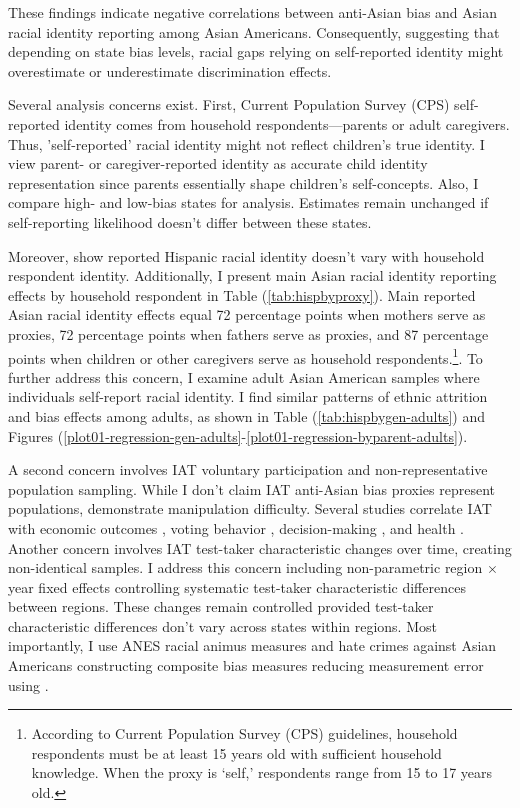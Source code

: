 These findings indicate negative correlations between anti-Asian bias and Asian racial identity reporting among Asian Americans. Consequently, suggesting that depending on state bias levels, racial gaps relying on self-reported identity might overestimate or underestimate discrimination effects.

Several analysis concerns exist. First, Current Population Survey (CPS) self-reported identity comes from household respondents—parents or adult caregivers. Thus, 'self-reported' racial identity might not reflect children's true identity. I view parent- or caregiver-reported identity as accurate child identity representation since parents essentially shape children's self-concepts. Also, I compare high- and low-bias states for analysis. Estimates remain unchanged if self-reporting likelihood doesn't differ between these states.

Moreover, \textcite{duncanIntermarriageIntergenerationalTransmission2011} show reported Hispanic racial identity doesn't vary with household respondent identity. Additionally, I present main Asian racial identity reporting effects by household respondent in Table (\ref{tab:hispbyproxy}). Main reported Asian racial identity effects equal 72 percentage points when mothers serve as proxies, 72 percentage points when fathers serve as proxies, and 87 percentage points when children or other caregivers serve as household respondents.\footnote{According to Current Population Survey (CPS) guidelines, household respondents must be at least 15 years old with sufficient household knowledge. When the proxy is `self,' respondents range from 15 to 17 years old.}. To further address this concern, I examine adult Asian American samples where individuals self-report racial identity. I find similar patterns of ethnic attrition and bias effects among adults, as shown in Table (\ref{tab:hispbygen-adults}) and Figures (\ref{plot01-regression-gen-adults}-\ref{plot01-regression-byparent-adults}).

A second concern involves IAT voluntary participation and non-representative population sampling. While I don't claim IAT anti-Asian bias proxies represent populations, \textcite{egloffPredictiveValidityImplicit2002} demonstrate manipulation difficulty. Several studies correlate IAT with economic outcomes \autocite{chettyRaceEconomicOpportunity2020,gloverDiscriminationSelfFulfillingProphecy2017}, voting behavior \autocite{friesePredictingVotingBehavior2007}, decision-making \autocite{bertrandImplicitDiscrimination2005,carlanaImplicitStereotypesEvidence2019}, and health \autocite{leitnerRacialBiasAssociated2016}. Another concern involves IAT test-taker characteristic changes over time, creating non-identical samples. I address this concern including non-parametric region $\times$ year fixed effects controlling systematic test-taker characteristic differences between regions. These changes remain controlled provided test-taker characteristic differences don't vary across states within regions. Most importantly, I use ANES racial animus measures and hate crimes against Asian Americans constructing composite bias measures reducing measurement error using \textcite{lubotskyInterpretationRegressionsMultiple2006}.

